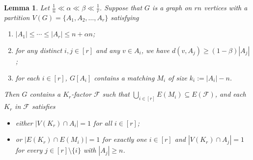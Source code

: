 \documentclass[11pt, a4paper]{article}
\newtheorem{lemma}[theorem]{Lemma}
\theoremstyle{definition}
\newcommand{\<}{\subseteq}
\begin{document}
\begin{lemma}\label{lem:balance}
Let $\frac{1}{n}\ll \alpha \ll \beta \ll\frac{1}{r}$. Suppose that $G$ is a graph on $rn$ vertices with a partition $V(G) =\{A_1, A_2,\ldots, A_r\}$ satisfying 
\begin{enumerate}
[label =\rm  (B\arabic{enumi})]
    \item\label{A1} $ |A_1|\leq \cdots\leq |A_r|\leq n+\alpha n$;
    
    \item\label{A3} for any distinct $i,j \in [r]$ and any $v \in A_i$, we have $d(v, A_j) \ge (1-\beta)|A_j|$;
    \item\label{A2} for each $i \in [r]$, $G[A_i]$ contains a matching $M_i$ of size $k_i:=|A_i|-n$.
\end{enumerate}
{Then $G$ contains a $K_r$-factor $\mathcal{F}$ such that $\bigcup_{i\in [r]}E(M_i)\subseteq E(\mathcal{F})$,  and each $K_r$ in $\mathcal{F}$ satisfies    
\begin{itemize}
    \item either $|V(K_r)\cap A_i|=1$ for all $i\in [r]$;
    \item  or $|E(K_r)\cap E(M_i)|=1$ for exactly one $i\in [r]$ and $|V(K_r)\cap A_j|=1$ for every $j\in [r]\setminus \{i\}$ with $|A_j|\geq n$.
\end{itemize}}
\end{lemma}


\end{document}
